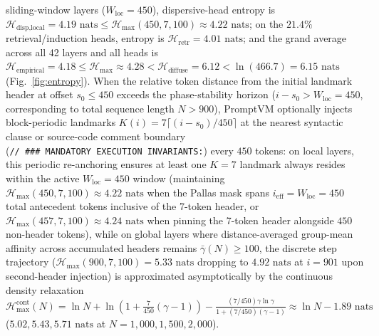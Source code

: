 \documentclass[conference,10pt]{IEEEtran}
\begin{document}
sliding-window layers ($W_{\text{loc}}=450$), dispersive-head entropy is $\mathcal{H}_{\text{disp,local}} = 4.19\text{ nats} \le \mathcal{H}_{\max}(450, 7, 100) \approx 4.22\text{ nats}$; on the $21.4\%$ retrieval/induction heads, entropy is $\mathcal{H}_{\text{retr}} = 4.01\text{ nats}$; and the grand average across all 42 layers and all heads is $\mathcal{H}_{\text{empirical}} = 4.18 \le \mathcal{H}_{\max} \approx 4.28 < \mathcal{H}_{\text{diffuse}} = 6.12 < \ln(466.7) = 6.15\text{ nats}$ (Fig.~\ref{fig:entropy}). When the relative token distance from the initial landmark header at offset $s_0 \le 450$ exceeds the phase-stability horizon ($i - s_0 > W_{\text{loc}} = 450$, corresponding to total sequence length $N > 900$), PromptVM optionally injects block-periodic landmarks $K(i) = 7\lceil (i - s_0)/450\rceil$ at the nearest syntactic clause or source-code comment boundary (\texttt{//\allowbreak\ \#\#\#\allowbreak\ MANDATORY\allowbreak\ EXECUTION\allowbreak\ INVARIANTS:}) every $450$ tokens: on local layers, this periodic re-anchoring ensures at least one $K=7$ landmark always resides within the active $W_{\text{loc}}=450$ window (maintaining $\mathcal{H}_{\max}(450, 7, 100) \approx 4.22\text{ nats}$ when the Pallas mask spans $i_{\text{eff}} = W_{\text{loc}} = 450$ total antecedent tokens inclusive of the 7-token header, or $\mathcal{H}_{\max}(457, 7, 100) \approx 4.24\text{ nats}$ when pinning the 7-token header alongside $450$ non-header tokens), while on global layers where distance-averaged group-mean affinity across accumulated headers remains $\bar{\gamma}(N) \ge 100$, the discrete step trajectory ($\mathcal{H}_{\max}(900, 7, 100) = 5.33\text{ nats}$ dropping to $4.92\text{ nats}$ at $i=901$ upon second-header injection) is approximated asymptotically by the continuous density relaxation $\mathcal{H}_{\max}^{\text{cont}}(N) = \ln N + \ln(1 + \frac{7}{450}(\gamma - 1)) - \frac{(7/450)\gamma\ln\gamma}{1 + (7/450)(\gamma - 1)} \approx \ln N - 1.89\text{ nats}$ ($5.02, 5.43, 5.71\text{ nats}$ at $N = 1{,}000, 1{,}500, 2{,}000$).
\end{document}
